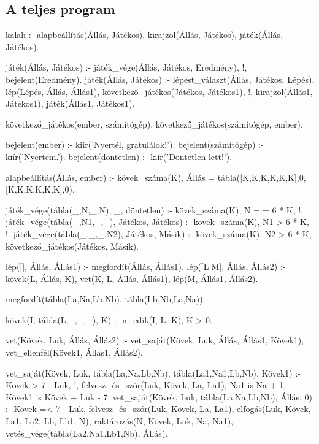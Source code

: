 \subsection*{A teljes program}
\begin{program}

kalah :-
    alapbeállítás(Állás, Játékos),
    kirajzol(Állás, Játékos),
    játék(Állás, Játékos).

játék(Állás, Játékos) :-
    játék_vége(Állás, Játékos, Eredmény), !,
    bejelent(Eredmény).
játék(Állás, Játékos) :-
    lépést_választ(Állás, Játékos, Lépés),
    lép(Lépés, Állás, Állás1),
    következő_játékos(Játékos, Játékos1), !,
    kirajzol(Állás1, Játékos1),
    játék(Állás1, Játékos1).

következő_játékos(ember, számítógép).
következő_játékos(számítógép, ember).

bejelent(ember) :- kiír('Nyertél, gratulálok!').
bejelent(számítógép) :- kiír('Nyertem.').
bejelent(döntetlen) :- kiír('Döntetlen lett!').


alapbeállítás(Állás, ember) :-
    kövek_száma(K),
    Állás = tábla([K,K,K,K,K,K],0,
                  [K,K,K,K,K,K],0).


játék_vége(tábla(_,N,_,N), _, döntetlen) :-
    kövek_száma(K), N =:= 6 * K, !.
játék_vége(tábla(_,N1,_,_), Játékos, Játékos) :-
    kövek_száma(K), N1 > 6 * K, !.
játék_vége(tábla(_,_,_,N2), Játékos, Másik) :-
    kövek_száma(K), N2 > 6 * K,
    következő_játékos(Játékos, Másik).

lép([], Állás, Állás1) :- megfordít(Állás, Állás1).
lép([L|M], Állás, Állás2) :-
    kövek(L, Állás, K),
    vet(K, L, Állás, Állás1),
    lép(M, Állás1, Állás2).

megfordít(tábla(La,Na,Lb,Nb), tábla(Lb,Nb,La,Na)).

kövek(I, tábla(L,_,_,_), K) :- n_edik(I, L, K), K > 0.

vet(Kövek, Luk, Állás, Állás2) :-
    vet_saját(Kövek, Luk, Állás, Állás1, Kövek1),
    vet_ellenfél(Kövek1, Állás1, Állás2).

vet_saját(Kövek, Luk, tábla(La,Na,Lb,Nb),
          tábla(La1,Na1,Lb,Nb), Kövek1) :-
    Kövek > 7 - Luk, !, %
    felvesz_és_szór(Luk, Kövek, La, La1),
    Na1 is Na + 1, Kövek1 is Kövek + Luk - 7.
vet_saját(Kövek, Luk,
          tábla(La,Na,Lb,Nb), Állás, 0) :-
    Kövek =< 7 - Luk,
    felvesz_és_szór(Luk, Kövek, La, La1),
    elfogás(Luk, Kövek, La1, La2, Lb, Lb1, N),
    raktározás(N, Kövek, Luk, Na, Na1),
    vetés_vége(tábla(La2,Na1,Lb1,Nb), Állás).


\end{program}
